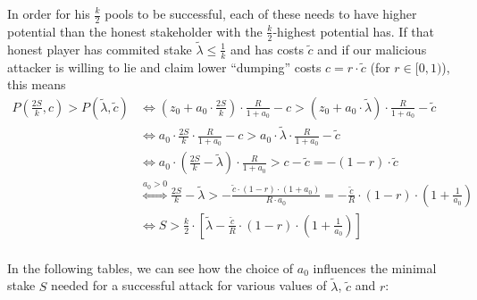 \documentclass[11pt,a4paper]{article}
\begin{document}
In order for his \(\frac{k}{2}\) pools to be successful, each of these
needs to have higher potential than the honest stakeholder with the
\(\frac{k}{2}\)-highest potential has. If that honest player has
commited stake \(\tilde{\lambda}\leq\frac{1}{k}\) and has costs
\(\tilde{c}\) and if our malicious attacker is willing to lie and claim
lower ``dumping'' costs \(c=r\cdot\tilde{c}\) (for \(r\in[0,1)\)), this
means \[
\begin{split}
    P\left(\frac{2S}{k}, c\right) > P(\tilde{\lambda}, \tilde{c})
    &\Longleftrightarrow
    \left(z_0+a_0\cdot\frac{2S}{k}\right)\cdot\frac{R}{1+a_0}-c > \left(z_0+a_0\cdot\tilde{\lambda}\right)\cdot\frac{R}{1+a_0}-\tilde{c} \\
    &\Longleftrightarrow
    a_0\cdot\frac{2S}{k}\cdot\frac{R}{1+a_0}-c > a_0\cdot\tilde{\lambda}\cdot\frac{R}{1+a_0}-\tilde{c} \\
    &\Longleftrightarrow
    a_0\cdot\left(\frac{2S}{k}-\tilde{\lambda}\right)\cdot\frac{R}{1+a_0} > c-\tilde{c}=-(1-r)\cdot\tilde{c} \\
    &\stackrel{a_0>0}{\Longleftrightarrow}
    \frac{2S}{k}-\tilde{\lambda} > -\frac{\tilde{c}\cdot(1-r)\cdot(1+a_0)}{R\cdot a_0} =
    -\frac{\tilde{c}}{R}\cdot(1-r)\cdot\left(1 + \frac{1}{a_0}\right) \\
    &\Longleftrightarrow
    S > \frac{k}{2}\cdot\left[\tilde{\lambda}-\frac{\tilde{c}}{R}\cdot(1-r)\cdot\left(1+\frac{1}{a_0}\right)\right] \\
\end{split}
\]

In the following tables, we can see how the choice of \(a_0\) influences
the minimal stake \(S\) needed for a successful attack for various
values of \(\tilde{\lambda}\), \(\tilde{c}\) and \(r\):
\end{document}
